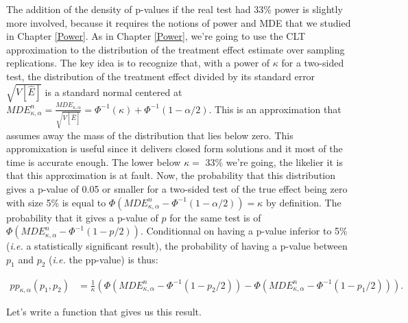 \documentclass[
]{book}
\theoremstyle{definition}
\theoremstyle{definition}
\theoremstyle{definition}
\theoremstyle{definition}
\theoremstyle{remark}
\begin{document}
The addition of the density of p-values if the real test had 33\% power is slightly more involved, because it requires the notions of power and MDE that we studied in Chapter \ref{Power}.
As in Chapter \ref{Power}, we're going to use the CLT approximation to the distribution of the treatment effect estimate over sampling replications.
The key idea is to recognize that, with a power of \(\kappa\) for a two-sided test, the distribution of the treatment effect divided by its standard error \(\sqrt{V[\hat{E}]}\) is a standard normal centered at \(MDE^n_{\kappa,\alpha}=\frac{MDE_{\kappa,\alpha}}{\sqrt{V[\hat{E}]}}=\Phi^{-1}(\kappa)+\Phi^{-1}(1-\alpha/2)\).
This is an approximation that assumes away the mass of the distribution that lies below zero.
This appromixation is useful since it delivers closed form solutions and it most of the time is accurate enough.
The lower below \(\kappa=\) 33\% we're going, the likelier it is that this approximation is at fault.
Now, the probability that this distribution gives a p-value of 0.05 or smaller for a two-sided test of the true effect being zero with size 5\% is equal to \(\Phi(MDE^n_{\kappa,\alpha}-\Phi^{-1}(1-\alpha/2))=\kappa\) by definition.
The probability that it gives a p-value of \(p\) for the same test is of \(\Phi(MDE^n_{\kappa,\alpha}-\Phi^{-1}(1-p/2))\).
Conditionnal on having a p-value inferior to 5\% (\textit{i.e.} a statistically significant result), the probability of having a p-value between \(p_1\) and \(p_2\) (\textit{i.e.} the pp-value) is thus:

\begin{align*}
  pp_{\kappa,\alpha}(p_1,p_2) & = \frac{1}{\kappa}\left(\Phi(MDE^n_{\kappa,\alpha}-\Phi^{-1}(1-p_2/2))-\Phi(MDE^n_{\kappa,\alpha}-\Phi^{-1}(1-p_1/2))\right).
\end{align*}

Let's write a function that gives us this result.
\end{document}
